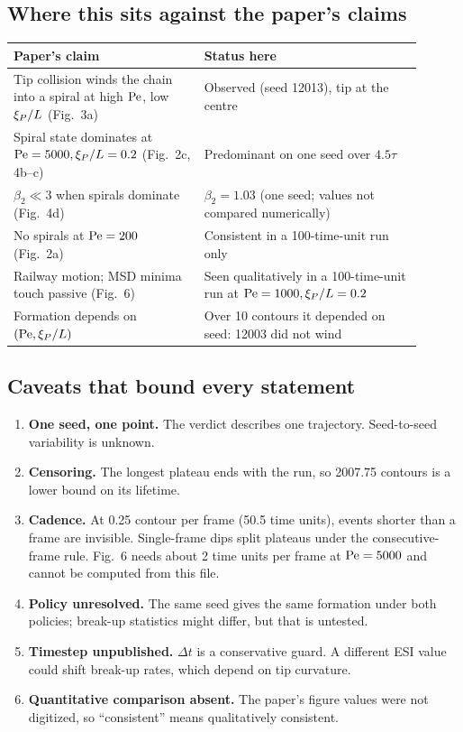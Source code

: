 \subsection{Where this sits against the paper's claims}
\begin{center}\small
\begin{tabular}{p{0.42\linewidth}p{0.48\linewidth}}\toprule Paper's claim & Status here\\ \midrule
Tip collision winds the chain into a spiral at high $\mathrm{Pe}$, low $\xi_{P}/L$ (Fig.~3a) & Observed (seed 12013), tip at the centre\\
Spiral state dominates at $\mathrm{Pe}=5000,\xi_{P}/L=0.2$ (Fig.~2c, 4b--c) & Predominant on one seed over $4.5\tau$\\
$\beta_2\ll3$ when spirals dominate (Fig.~4d) & $\beta_2=1.03$ (one seed; values not compared numerically)\\
No spirals at $\mathrm{Pe}=200$ (Fig.~2a) & Consistent in a 100-time-unit run only\\
Railway motion; MSD minima touch passive (Fig.~6) & Seen qualitatively in a 100-time-unit run at $\mathrm{Pe}=1000,\xi_{P}/L=0.2$\\
Formation depends on $(\mathrm{Pe},\xi_{P}/L)$ & Over 10 contours it depended on seed: 12003 did not wind\\
\bottomrule\end{tabular}
\end{center}

\subsection{Caveats that bound every statement}
\begin{enumerate}
\item \textbf{One seed, one point.} The verdict describes one trajectory. Seed-to-seed variability is unknown.
\item \textbf{Censoring.} The longest plateau ends with the run, so 2007.75 contours is a lower bound on its lifetime.
\item \textbf{Cadence.} At 0.25 contour per frame (50.5 time units), events shorter than a frame are invisible. Single-frame dips split plateaus under the consecutive-frame rule.
Fig.~6 needs about 2 time units per frame at $\mathrm{Pe}=5000$ and cannot be computed from this file.
\item \textbf{Policy unresolved.} The same seed gives the same formation under both policies; break-up statistics might differ, but that is untested.
\item \textbf{Timestep unpublished.} $\Delta t$ is a conservative guard. A different ESI value could shift break-up rates, which depend on tip curvature.
\item \textbf{Quantitative comparison absent.} The paper's figure values were not digitized, so ``consistent'' means qualitatively consistent.
\end{enumerate}

